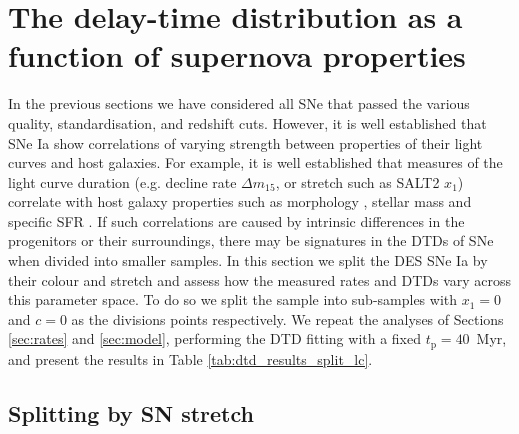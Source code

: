 \documentclass[fleqn,usenatbib]{mnras}
\begin{document}
\section{The delay-time distribution as a function of supernova properties}
\label{sec:split_x1_c}

In the previous sections we have considered all SNe that passed the various quality, standardisation, and redshift cuts. However, it is well established that SNe Ia show correlations of varying strength between properties of their light curves and host galaxies. For example, it is well established that measures of the light curve duration (e.g. decline rate $\Delta m_{15}$, or stretch such as SALT2 $x_1$) correlate with host galaxy properties such as morphology \citep{Hamuy1995,Hamuy2000,Mannucci2005}, stellar mass \citep{Kelly2010,Lampeitl2010,Sullivan2010} and specific SFR \citep{Rigault2013,Rigault2018}. If such correlations are caused by intrinsic differences in the progenitors or their surroundings, there may be signatures in the DTDs of SNe when divided into smaller samples. In this section we split the DES SNe Ia by their colour and stretch and assess how the measured rates and DTDs vary across this parameter space. To do so we split the sample into sub-samples with $x_1 = 0$ and $c=0$ as the divisions points respectively. We repeat the analyses of Sections \ref{sec:rates} and \ref{sec:model}, performing the DTD fitting with a fixed $t_{\mathrm{p}} = 40$~Myr, and present the results in Table \ref{tab:dtd_results_split_lc}.

\subsection{Splitting by SN stretch \label{subsec:split_x1}}
\end{document}

